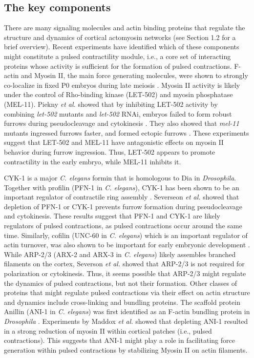 \documentclass{ucetd}
\begin{document}
\subsection{The key components}
There are many signaling molecules and actin binding proteins that regulate the structure and dynamics of cortical actomyosin networks (see Section 1.2 for a brief overview).  Recent experiments have identified which of these components might constitute a pulsed contractility module, i.e., a core set of interacting proteins whose activity is sufficient for the formation of pulsed contractions.  F-actin and Myosin II, the main force generating molecules, were shown to strongly co-localize in fixed P0 embryos during late meiosis \cite{Munro:2004jk}.  Myosin II activity is likely under the control of Rho-binding kinase (LET-502) and myosin phosphatase (MEL-11).  Piekny \textit{et al.} showed that by inhibiting LET-502 activity by combining \textit{let-502} mutants and \textit{let-502} RNAi, embryos failed to form robust furrows during pseudocleavage and cytokinesis \cite{Piekny:2002vx}.  They also showed that \textit{mel-11} mutants ingressed furrows faster, and formed ectopic furrows \cite{Piekny:2002vx}.  These experiments suggest that LET-502 and MEL-11 have antagonistic effects on myosin II behavior during furrow ingression.  Thus, LET-502 appears to promote contractility in the early embryo, while MEL-11 inhibits it. 


CYK-1 is a major \textit{C. elegans} formin that is homologous to Dia in \textit{Drosophila}.  Together with profilin (PFN-1 in \textit{C. elegans}), CYK-1 has been shown to be an important regulator of contractile ring assembly \cite{Severson:2002ve}.  Severseon \textit{et al.} showed that depletion of PFN-1 or CYK-1 prevents furrow formation during pseudocleavage and cytokinesis.  These results suggest that PFN-1 and CYK-1 are likely regulators of pulsed contractions, as pulsed contractions occur around the same time.  Similarly, cofilin (UNC-60 in \textit{C. elegans}) which is an important regulator of actin turnover, was also shown to be important for early embryonic development \cite{Ono:2003bg}.  While ARP-2/3 (ARX-2 and ARX-3 in \textit{C. elegans}) likely assembles branched filaments on the cortex, Severson \textit{et al.} showed that ARP-2/3 is not required for polarization or cytokinesis.  Thus, it seems possible that ARP-2/3 might regulate the dynamics of pulsed contractions, but not their formation.  Other classes of proteins that might regulate pulsed contractions via their effect on actin structure and dynamics include cross-linking and bundling proteins.  The scaffold protein Anillin (ANI-1 in \textit{C. elegans}) was first identified as an F-actin bundling protein in \textit{Drosophila} \cite{Field:1995vb}.  Experiments by Maddox \textit{et al.} showed that depleting ANI-1 resulted in a strong reduction of myosin II within cortical patches (i.e., pulsed contractions).  This suggests that ANI-1 might play a role in facilitating force generation within pulsed contractions by stabilizing Myosin II on actin filaments.
\end{document}
